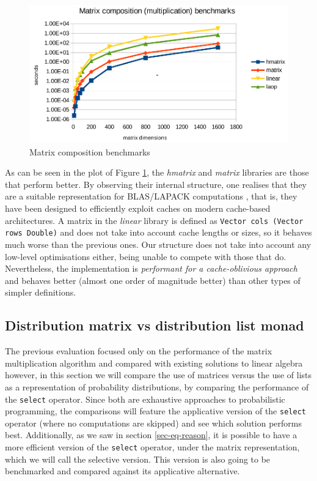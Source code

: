 \documentclass[
  oneside,
  11pt, a4paper,
  footinclude=true,
  headinclude=true,
  cleardoublepage=empty
]{scrbook}
\theoremstyle{definition}
\theoremstyle{definition}
\begin{document}
    \begin{figure}[H]%
    \centering
      \includegraphics[width=\linewidth]{img/report1.pdf}
        \caption{Matrix composition benchmarks}
        \label{fig:bench}
    \end{figure}
    
    As can be seen in the plot of Figure \ref{fig:bench}, the \emph{hmatrix} and \emph{matrix} libraries are those that perform better. By observing their internal structure, one realises that they are a suitable representation for BLAS/LAPACK computations \citep{anderson1999lapack}, that is, they have been designed to efficiently exploit caches on modern cache-based architectures. A matrix in the \emph{linear} library is defined as \texttt{Vector cols (Vector rows Double)} and does not take into account cache lengths or sizes, so it behaves much worse than the previous ones. Our structure does not take into account any low-level optimisations either, being unable to compete with those that do. Nevertheless, the implementation is \emph{performant for a cache-oblivious approach} and behaves better (almost one order of magnitude better) than other types of simpler definitions.
        
        \subsection{Distribution matrix vs distribution list monad}
        
        The previous evaluation focused only on the performance of the matrix multiplication algorithm and compared with existing solutions to linear algebra however, in this section we will compare the use of matrices versus the use of lists as a representation of probability distributions, by comparing the performance of the \texttt{select} operator. Since both are exhaustive approaches to probabilistic programming, the comparisons will feature the applicative version of the \texttt{select} operator (where no computations are skipped) and see which solution performs best. Additionally, as we saw in section \ref{sec-eq-reason}, it is possible to have a more efficient version of the \texttt{select} operator, under the matrix representation, which we will call the selective version. This version is also going to be benchmarked and compared against its applicative alternative.
        
\end{document}

